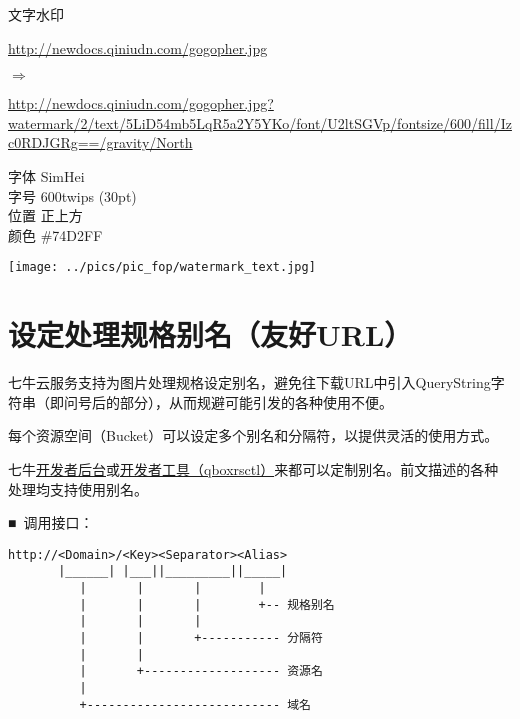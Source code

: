 \documentclass[11pt, oneside]{book}
\newcommand{\qsym}[1]{
\footnotesize
\noindent
#1\par
\normalsize
}
\newcommand{\qpara}[1]{
\vspace{0.3em}
\noindent
#1\par
\vspace{0.3em}
}
\newcommand{\qsamplelink}[1]{
\vspace{0.2em}
\noindent
#1\par
\vspace{0.1em}
}
\newcommand{\qurl}[1]{\footnotesize\url{#1}\normalsize}
\begin{document}
\begin{sample}
  \caption{文字水印}
    \qsamplelink{\qurl{http://newdocs.qiniudn.com/gogopher.jpg}}
    \qsym{$\Rightarrow$}
    \qurl{http://newdocs.qiniudn.com/gogopher.jpg?watermark/2/text/5LiD54mb5LqR5a2Y5YKo/font/U2ltSGVp/fontsize/600/fill/Izc0RDJGRg==/gravity/North}
    \linebreak

\footnotesize
\qpara{字体 SimHei \\ 字号 600twips (30pt) \\ 位置 正上方 \\ 颜色 \#74D2FF}
\normalsize

    \begin{center}
      \texttt{[image: ../pics/pic\_fop/watermark\_text.jpg]}
    \end{center}
\end{sample}

\clearpage

\section{设定处理规格别名（友好URL）}

\qpara{七牛云服务支持为图片处理规格设定别名，避免往下载URL中引入QueryString字符串（即问号后的部分），从而规避可能引发的各种使用不便。}
\qpara{每个资源空间（Bucket）可以设定多个别名和分隔符，以提供灵活的使用方式。}
\qpara{七牛\href{https://portal.qiniu.com}{开发者后台}或\href{http://docs.qiniu.com/tools/v6/qboxrsctl.html}{开发者工具（qboxrsctl）}来都可以定制别名。前文描述的各种处理均支持使用别名。}

\qpara{■\ 调用接口：}
\begin{lstlisting}
http://<Domain>/<Key><Separator><Alias>
       |______| |___||_________||_____|
          |       |       |        |
          |       |       |        +-- 规格别名
          |       |       |
          |       |       +----------- 分隔符
          |       |
          |       +------------------- 资源名
          |
          +--------------------------- 域名
\end{lstlisting}
\end{document}
